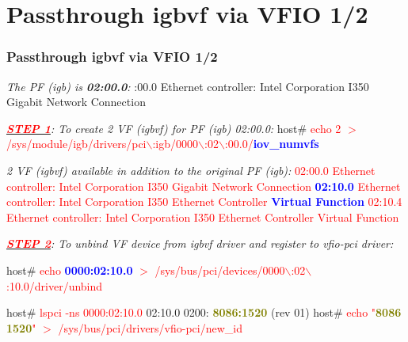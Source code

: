 \documentclass[aspectratio=169]{beamer}
\begin{document}
\section{Passthrough igbvf via VFIO 1/2}
\begin{frame}
\frametitle{Passthrough igbvf via VFIO 1/2}
{\small
\textit{The PF (igb) is \textbf{02:00.0}:} :00.0 Ethernet controller: Intel Corporation I350 Gigabit Network Connection
}
\begin{block}{}
\small
\textit{\underline{\textbf{\textcolor{red}{STEP 1}}}: To create 2 VF (igbvf) for PF (igb) 02:00.0:} \newline
host\# \textcolor{red}{echo 2 $>$ /sys/module/igb/drivers/pci$\backslash$:igb/0000$\backslash$:02$\backslash$:00.0/\textbf{\textcolor{blue}{iov\_numvfs}}}

\vspace{2 mm}

\textit{2 VF (igbvf) available in addition to the original PF (igb):} \newline
\textcolor{red}{02:00.0 Ethernet controller: Intel Corporation I350 Gigabit Network Connection} \newline
\textcolor{red}{\textbf{\textcolor{blue}{02:10.0}} Ethernet controller: Intel Corporation I350 Ethernet Controller \textbf{\textcolor{blue}{Virtual Function}}} \newline
\textcolor{red}{02:10.4 Ethernet controller: Intel Corporation I350 Ethernet Controller Virtual Function}
\end{block}
\begin{block}{}
\textit{\underline{\textbf{\textcolor{red}{STEP 2}}}: To unbind VF device from igbvf driver and register to vfio-pci driver:}

\vspace{2 mm}

host\# \textcolor{red}{echo \textbf{\textcolor{blue}{0000:02:10.0}} $>$ /sys/bus/pci/devices/0000$\backslash$:02$\backslash$:10.0/driver/unbind}

\vspace{1 mm}

host\# \textcolor{red}{lspci -ns 0000:02:10.0} \newline
{\small 02:10.0 0200: \textbf{\textcolor{olive}{8086:1520}} (rev 01)} \newline
host\# \textcolor{red}{echo "\textbf{\textcolor{olive}{8086 1520}}" $>$ /sys/bus/pci/drivers/vfio-pci/new\_id}
\end{block}
\end{frame}
\end{document}
